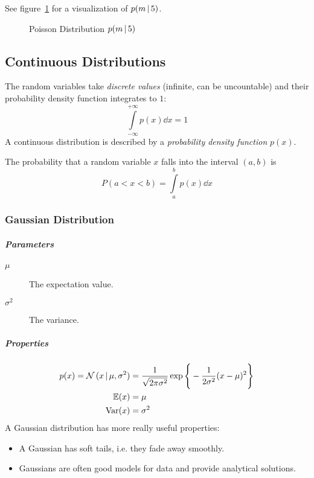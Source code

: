 		See figure~\ref{fig:poissonDistribution} for a visualization of \( p(m \,\vert\, 5) \).

		\begin{figure}
			\centering
			\caption{Poisson Distribution \( p(m \,\vert\, 5) \)}
			\label{fig:poissonDistribution}
		\end{figure}

\subsection{Continuous Distributions}
The random variables take \emph{discrete values} (infinite, can be uncountable) and their probability density function integrates to \(1\):
\begin{equation}
	\int\limits_{-\infty}^{+\infty} p(x) \dd{x} = 1
\end{equation}
A continuous distribution is described by a \emph{probability density function} \(p(x)\).

The probability that a random variable \( x \) falls into the interval \( (a, b) \) is
\begin{equation}
	P(a < x < b) = \int\limits_a^b p(x) \dd{x}
\end{equation}

\subsubsection{Gaussian Distribution}
\subparagraph{Parameters}
	\begin{description}
		\item[\(\mu\)] The expectation value.
		\item[\(\sigma^2\)] The variance.
	\end{description}

	\subparagraph{Properties}
		\begin{align}
			p(x) = \mathcal{N}\,(x \,\vert\, \mu, \sigma^2) & = \frac{1}{\sqrt{2\pi\sigma^2}} \exp\Bigg\{ -\frac{1}{2\sigma^2} (x - \mu)^2 \Bigg\} \\
			\mathbb{E}(x)                                        & = \mu                                                                                \\
			\operatorname{Var}(x)                                      & = \sigma^2
		\end{align}
		A Gaussian distribution has more really useful properties:
		\begin{itemize}
			\item A Gaussian has soft tails, i.e. they fade away smoothly.
			\item Gaussians are often good models for data and provide analytical solutions.
		\end{itemize}

